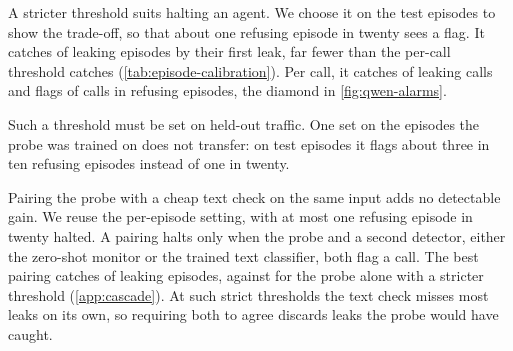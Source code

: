 A stricter threshold suits halting an agent.
We choose it on the test episodes to show the trade-off, so that about one refusing episode in twenty sees a flag.
It catches \qwenEpisodeCalCaught{} of leaking episodes by their first leak, far fewer than the per-call threshold catches (\cref{tab:episode-calibration}).
Per call, it catches \qwenCalibrationEpisodeLeakCallsRateRounded{} of leaking calls and flags \qwenCalibrationEpisodeRefusingCallsRate{} of calls in refusing episodes, the diamond in \cref{fig:qwen-alarms}.

Such a threshold must be set on held-out traffic.
One set on the episodes the probe was trained on does not transfer: on test episodes it flags about three in ten refusing episodes instead of one in twenty.

Pairing the probe with a cheap text check on the same input adds no detectable gain.
We reuse the per-episode setting, with at most one refusing episode in twenty halted.
A pairing halts only when the probe and a second detector, either the zero-shot monitor or the trained text classifier, both flag a call.
The best pairing catches \cascadeBowGridFiveCaught{} of \qwenCalibrationEpisodeLeakEpisodesDenominator{} leaking episodes, against \cascadeProbeAloneFiveCaught{} for the probe alone with a stricter threshold (\cref{app:cascade}).
At such strict thresholds the text check misses most leaks on its own, so requiring both to agree discards leaks the probe would have caught.
